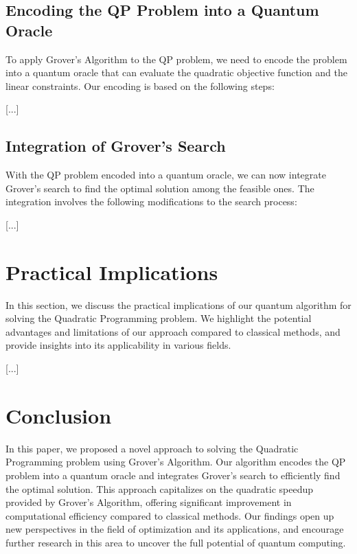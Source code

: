 \subsection{Encoding the QP Problem into a Quantum Oracle}

To apply Grover's Algorithm to the QP problem, we need to encode the problem into a quantum oracle that can evaluate the quadratic objective function and the linear constraints. Our encoding is based on the following steps:

[...]

\subsection{Integration of Grover's Search}

With the QP problem encoded into a quantum oracle, we can now integrate Grover's search to find the optimal solution among the feasible ones. The integration involves the following modifications to the search process:

[...]

\section{Practical Implications}

In this section, we discuss the practical implications of our quantum algorithm for solving the Quadratic Programming problem. We highlight the potential advantages and limitations of our approach compared to classical methods, and provide insights into its applicability in various fields.

[...]

\section{Conclusion}

In this paper, we proposed a novel approach to solving the Quadratic Programming problem using Grover's Algorithm. Our algorithm encodes the QP problem into a quantum oracle and integrates Grover's search to efficiently find the optimal solution. This approach capitalizes on the quadratic speedup provided by Grover's Algorithm, offering significant improvement in computational efficiency compared to classical methods. Our findings open up new perspectives in the field of optimization and its applications, and encourage further research in this area to uncover the full potential of quantum computing.

